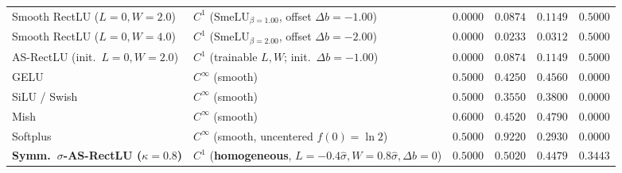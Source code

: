 \documentclass[11pt, a4paper]{article}
\begin{document}
\begin{table}[!htbp]
{\begin{tabular}{l l c c c c}
\rowcolor{alertred}
Smooth RectLU ($L=0, W=2.0$) & $C^{1}$ ($\text{SmeLU}_{\beta=1.00}$, offset $\Delta b = -1.00$) & $0.0000$ & $0.0874$ & $0.1149$ & $0.5000$ \\
\rowcolor{alertred}
Smooth RectLU ($L=0, W=4.0$) & $C^{1}$ ($\text{SmeLU}_{\beta=2.00}$, offset $\Delta b = -2.00$) & $0.0000$ & $0.0233$ & $0.0312$ & $0.5000$ \\
\rowcolor{alertred}
AS-RectLU (init.\ $L=0, W=2.0$) & $C^{1}$ (trainable $L, W$; init.\ $\Delta b = -1.00$) & $0.0000$ & $0.0874$ & $0.1149$ & $0.5000$ \\
GELU & $C^{\infty}$ (smooth) & $0.5000$ & $0.4250$ & $0.4560$ & $0.0000$ \\
SiLU / Swish & $C^{\infty}$ (smooth) & $0.5000$ & $0.3550$ & $0.3800$ & $0.0000$ \\
Mish & $C^{\infty}$ (smooth) & $0.6000$ & $0.4520$ & $0.4790$ & $0.0000$ \\
Softplus & $C^{\infty}$ (smooth, uncentered $f(0)=\ln 2$) & $0.5000$ & $0.9220$ & $0.2930$ & $0.0000$ \\
\rowcolor{goodgreen}
\textbf{Symm.\ $\sigma$-AS-RectLU ($\kappa=0.8$)} & $C^{1}$ (\textbf{homogeneous}, $L=-0.4\hat{\sigma}, W=0.8\hat{\sigma}, \Delta b=0$) & $0.5000$ & $0.5020$ & $0.4479$ & $0.3443$ \\
\bottomrule
\end{tabular}%
}
\end{table}
\end{document}
